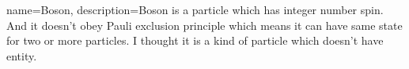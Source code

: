 {
    name=Boson,
    description={Boson is a particle which has integer number spin. And it doesn't obey Pauli exclusion principle which means it can have same state for two or more particles. I thought it is a kind of particle which doesn't have entity.}
}

